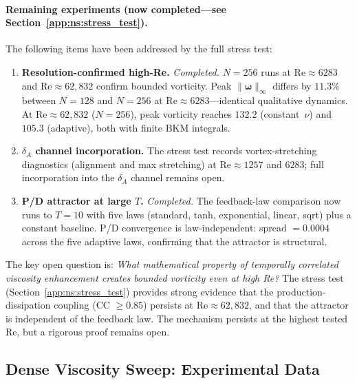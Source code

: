 \paragraph{Remaining experiments (now completed---see
Section~\ref{app:ns:stress_test}).}
The following items have been addressed by the full stress test:
\begin{enumerate}
\item \textbf{Resolution-confirmed high-Re.}  \emph{Completed.}
  $N=256$ runs at $\mathrm{Re}\approx 6283$ and
  $\mathrm{Re}\approx 62{,}832$ confirm bounded vorticity.
  Peak $\|\bm{\omega}\|_\infty$ differs by $11.3\%$ between
  $N=128$ and $N=256$ at $\mathrm{Re}\approx 6283$---identical
  qualitative dynamics.  At $\mathrm{Re}\approx 62{,}832$ ($N=256$),
  peak vorticity reaches $132.2$ (constant~$\nu$) and $105.3$
  (adaptive), both with finite BKM integrals.

\item \textbf{$\delta_A$ channel incorporation.}  The stress
  test records vortex-stretching diagnostics (alignment and
  max stretching) at $\mathrm{Re}\approx 1257$ and $6283$;
  full incorporation into the $\delta_A$ channel remains open.

\item \textbf{P/D attractor at large $T$.}  \emph{Completed.}
  The feedback-law comparison now runs to $T=10$ with five
  laws (standard, tanh, exponential, linear, sqrt) plus a
  constant baseline.  P/D convergence is law-independent:
  spread $= 0.0004$ across the five adaptive laws, confirming
  that the attractor is structural.
\end{enumerate}

The key open question is: \emph{What mathematical property
of temporally correlated viscosity enhancement creates
bounded vorticity even at high Re?}  The stress test
(Section~\ref{app:ns:stress_test}) provides strong evidence
that the production-dissipation coupling (CC $\ge 0.85$)
persists at $\mathrm{Re}\approx 62{,}832$, and that the
attractor is independent of the feedback law.  The
mechanism persists at the highest tested Re, but a
rigorous proof remains open.

\subsection{Dense Viscosity Sweep: Experimental Data}
\label{app:ns:nu_c_experiment}

